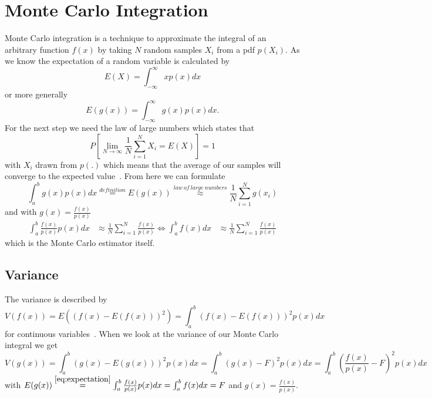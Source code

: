 \section{Monte Carlo Integration}
\label{sec:monte_carlo}
Monte Carlo integration is a technique to approximate the integral of an arbitrary function $ f(x) $
by taking $ N $ random samples $ X_i $ from a pdf $ p(X_i) $.
As we know the expectation of a random variable is calculated by $$ E(X) = \int_{-\infty}^\infty x p(x) dx $$
or more generally
\begin{equation}
    \label{eq:expectation}
    E(g(x)) = \int_{-\infty}^\infty g(x) p(x) dx.
\end{equation}
For the next step we need the law of large numbers which states that $$ P\left[ \lim_{N\to\infty} \frac{1}{N} \sum_{i = 1}^N X_i = E(X) \right] = 1 $$
with $ X_i $ drawn from $ p(.) $ which means that the average of our samples will converge to the expected value~\cite[Chapter~2.4.1]{veach-thesis}.
From here we can formulate
\begin{equation*}
    \int_{a}^b g(x) p(x) dx \overset{definition}= E(g(x))
    \overset{law~of~large~numbers}\approx \frac{1}{N} \sum_{i = 1}^N g(x_i)
\end{equation*}
and with $ g(x) = \frac{f(x)}{p(x)} $
\begin{equation}
\label{eq:monte_carlo_integral}
\begin{aligned}
    \int_{a}^b \frac{f(x)}{p(x)} p(x) dx &\approx \frac{1}{N} \sum_{i = 1}^N \frac{f(x)}{p(x)}
    \Leftrightarrow \int_{a}^b f(x) dx &\approx \frac{1}{N} \sum_{i = 1}^N \frac{f(x)}{p(x)}
\end{aligned}
\end{equation}
which is the Monte Carlo estimator itself.


\subsection{Variance}
\label{sec:variance}
The variance is described by $$ V(f(x)) = E((f(x) - E(f(x)))^2) = \int_{a}^b (f(x) - E(f(x)))^2 p(x) dx $$ for continuous variables~\cite[Chapter~13.1.2]{pbr-book}.
When we look at the variance of our Monte Carlo integral we get
\begin{equation}
\label{eq:monte_carlo_variance}
    V(g(x)) = \int_{a}^b (g(x) - E(g(x)))^2 p(x) dx
            = \int_{a}^b (g(x) - F)^2 p(x) dx
            = \int_{a}^b \left(\frac{f(x)}{p(x)} - F\right)^2 p(x) dx
\end{equation}
with $ E(g(x)) \overset{\ref{eq:expectation}}= \int_a^b \frac{f(x)}{p(x)} p(x) dx = \int_a^b f(x) dx = F $ and $ g(x) = \frac{f(x)}{p(x)} $.


